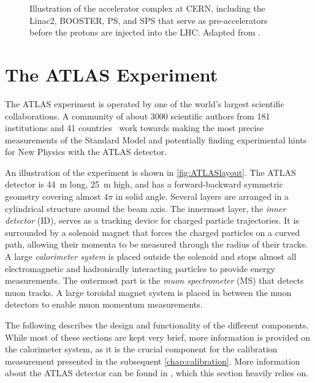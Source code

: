 \begin{figure}
    \caption{Illustration of the accelerator complex at CERN, including the Linac2, BOOSTER, PS, and SPS that serve as pre-accelerators before the protons are injected into the LHC. Adapted from .}
    \label{fig:accelerator-complex}
\end{figure}









\section{The ATLAS Experiment}

The ATLAS experiment is operated by one of the world's largest scientific collaborations. A community of about 3000 scientific authors from 181 institutions and 41 countries~\cite{AtlasCollab} work towards making the most precise measurements of the Standard Model and potentially finding experimental hints for New Physics with the ATLAS detector.

An illustration of the experiment is shown in \cref{fig:ATLASlayout}.
The ATLAS detector is \SI{44}{\meter} long, \SI{25}{\meter} high, and has a forward-backward symmetric geometry covering almost $4\pi$ in solid angle.
Several layers are arranged in a cylindrical structure around the beam axis.
The innermost layer, the \emph{inner detector} (ID), serves as a tracking device for charged particle trajectories. It is surrounded by a solenoid magnet that forces the charged particles on a curved path, allowing their momenta to be measured through the radius of their tracks. 
A large \emph{calorimeter system} is placed outside the solenoid and stops almost all electromagnetic and hadronically interacting particles to provide energy measurements. The outermost part is the \emph{muon spectrometer} (MS) that detects muon tracks. A large toroidal magnet system is placed in between the muon detectors to enable muon momentum measurements.

The following describes the design and functionality of the different components.
While most of these sections are kept very brief, more information is provided on the calorimeter system, as it is the crucial component for the calibration measurement presented in the subsequent \cref{chap:calibration}.
More information about the ATLAS detector can be found in , which this section heavily relies on.

